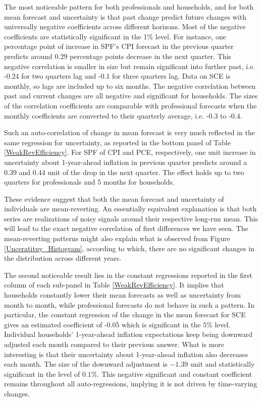 \documentclass[12pt]{article}
\begin{document}
    The most noticeable pattern for both professionals and households, and for both mean forecast and uncertainty is that past change predict future changes with universally negative coefficients across different horizons. Most of the negative coefficients are statistically significant in the 1\% level. For instance, one percentage point of increase in SPF's CPI forecast in the previous quarter predicts around 0.29 percentage points decrease in the next quarter. This negative correlation is smaller in size but remain significant into further past, i.e. -0.24 for two quarters lag and -0.1 for three quarters lag. Data on SCE is monthly, so lags are included up to six months. The negative correlation between past and current changes are all negative and significant for households. The sizes of the correlation coefficients are comparable with professional forecasts when the monthly coefficients are converted to their quarterly average, i.e. -0.3 to -0.4. 
    
    Such an auto-correlation of change in mean forecast is very much reflected in the same regression for uncertainty, as reported in the bottom panel of Table \ref{WeakRevEfficiency}.  For SPF of CPI and PCE, respectively, one unit increase in uncertainty about 1-year-ahead inflation in previous quarter predicts around a 0.39 and 0.44 unit of the drop in the next quarter. The effect holds up to two quarters for professionals and 5 months for households. 
    
    These evidence suggest that both the mean forecast and uncertainty of individuals are mean-reverting. An essentially equivalent explanation is that both series are realizations of noisy signals around their respective long-run mean. This will lead to the exact negative correlation of first differences we have seen. The mean-reverting patterns might also explain what is observed from Figure \ref{Unceratitny_Histogram}, according to which, there are no significant changes in the distribution across different years. 
    
    The second noticeable result lies in the constant regressions reported in the first column of each sub-panel in Table \ref{WeakRevEfficiency}. It implies that households constantly lower their mean forecasts as well as uncertainty from month to month, while professional forecasts do not behave in such a pattern. In particular, the constant regression of the change in the mean forecast for SCE gives an estimated coefficient of -0.05 which is significant in the $5\%$ level. Individual households' 1-year-ahead inflation expectations keep being downward adjusted each month compared to their previous answer. What is more interesting is that their uncertainty about 1-year-ahead inflation also decreases each month.  The size of the downward adjustment is  $-1.39$ unit and statistically significant in the level of $0.1\%$. This negative significant and constant coefficient remains throughout all auto-regressions, implying it is not driven by time-varying changes. 
\end{document}

